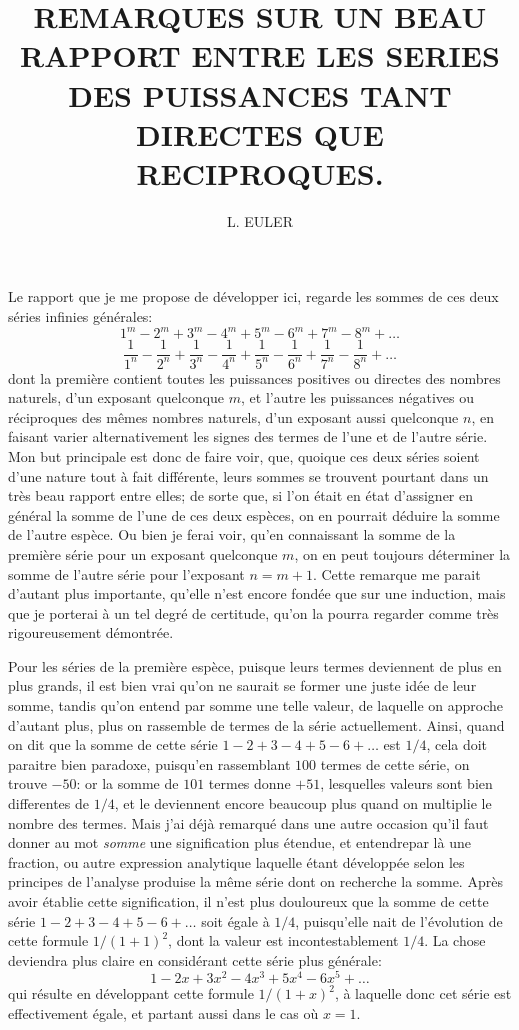 \documentclass[12pt]{article}
\title{REMARQUES SUR UN BEAU RAPPORT ENTRE LES SERIES DES PUISSANCES TANT DIRECTES QUE RECIPROQUES.}
\author{L. EULER}
\date{}
\theoremstyle{definition}
\newcounter{prop}[section]
\begin{document}
\maketitle

Le rapport que je me propose de développer ici, regarde les sommes de ces deux séries infinies générales:
\begin{equation} \label{première espèce}
  1^m - 2^m + 3^m - 4^m + 5^m - 6^m + 7^m - 8^m + \dots
\end{equation}
\begin{equation}\label{deuxième espèce}
  \frac{1}{1^n} - \frac{1}{2^n} + \frac{1}{3^n} - \frac{1}{4^n} + \frac{1}{5^n} - \frac{1}{6^n} + \frac{1}{7^n} - \frac{1}{8^n} + \dots
\end{equation}
dont la première contient toutes les puissances positives ou directes des nombres naturels, d'un exposant quelconque $m$, et l'autre les puissances négatives ou réciproques des mêmes nombres naturels, d'un exposant aussi quelconque $n$, en faisant varier alternativement les signes des termes de l'une et de l'autre série. Mon but principale est donc de faire voir, que, quoique ces deux séries soient d'une nature tout à fait différente, leurs sommes se trouvent pourtant dans un très beau rapport entre elles; de sorte que, si l'on était en état d'assigner en général la somme de l'une de ces deux espèces, on en pourrait déduire la somme de l'autre espèce. Ou bien je ferai voir, qu'en connaissant la somme de la première série pour un exposant quelconque $m$, on en peut toujours déterminer la somme de l'autre série pour l'exposant $n=m+1$. Cette remarque me parait d'autant plus importante, qu'elle n'est encore fondée que sur une induction, mais que je porterai à un tel degré de certitude, qu'on la pourra regarder comme très rigoureusement démontrée.

Pour les séries de la première espèce, puisque leurs termes deviennent de plus en plus grands, il est bien vrai qu'on ne saurait se former une juste idée de leur somme, tandis qu'on entend par somme une telle valeur, de laquelle on approche d'autant plus, plus on rassemble de termes de la série actuellement. Ainsi, quand on dit que la somme de cette série $1-2+3-4+5-6 + \dots$ est $1/4$, cela doit paraitre bien paradoxe, puisqu'en rassemblant $100$ termes de cette série, on trouve $-50$: or la somme de $101$ termes donne $+51$, lesquelles valeurs sont bien differentes de $1/4$, et le deviennent encore beaucoup plus quand on multiplie le nombre des termes. Mais j'ai déjà remarqué dans une autre occasion qu'il faut donner au mot \textit{somme} une signification plus étendue, et entendrepar là une fraction, ou autre expression analytique laquelle étant développée selon les principes de l'analyse produise la même série dont on recherche la somme. Après avoir établie cette signification, il n'est plus douloureux que la somme de cette série $1-2+3-4+5-6 + \dots$ soit égale à $1/4$, puisqu'elle nait de l'évolution de cette formule $1/(1+1)^2$, dont la valeur est incontestablement $1/4$. La chose deviendra plus claire en considérant cette série plus générale:
$$1 - 2x + 3x^2 - 4x^3 + 5x^4 - 6x^5 + \dots$$
qui résulte en développant cette formule $1/(1+x)^2$, à laquelle donc cet série est effectivement égale, et partant aussi dans le cas où $x=1$.
\end{document}
